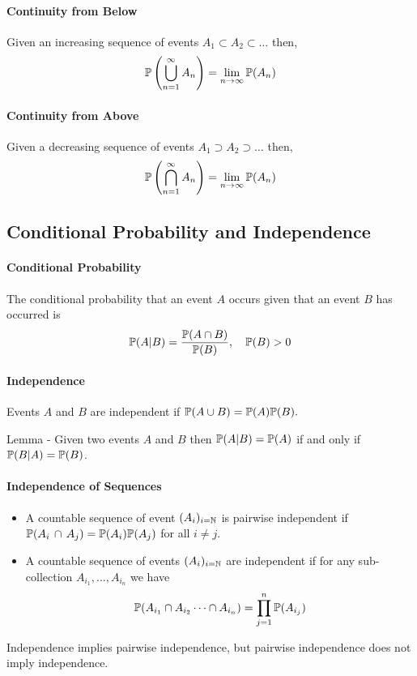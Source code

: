 \paragraph {Continuity from Below}
Given an increasing sequence of events \(A_1 \subset A_2 \subset \dots\) then, 
\[
    \mathbb{P}\left(
        \bigcup_{n=1}^{\infty} A_n
    \right)
    =
    \lim_{n\to\infty} \mathbb{P} (A_n)
\]

\paragraph {Continuity from Above}
Given a decreasing sequence of events \(A_1 \supset A_2 \supset \dots\) then, 
\[
    \mathbb{P}\left(
        \bigcap_{n=1}^{\infty} A_n
    \right)
    =
    \lim_{n\to\infty} \mathbb{P} (A_n)
\]

\subsection{Conditional Probability and Independence}
\paragraph{Conditional Probability}
The conditional probability that an event \(A\) occurs given that an event \(B\) has occurred is 
\[\mathbb{P}(A|B) = \frac{\mathbb{P}(A\cap B)}{\mathbb{P}(B)}, \quad \mathbb{P}(B) > 0\]

\paragraph{Independence}
Events \(A\) and \(B\) are independent if \(\mathbb{P}(A \cup B) = \mathbb{P}(A)\mathbb{P}(B).\)

Lemma - Given two events \(A\) and \(B\) then \(\mathbb{P}(A|B) = \mathbb{P}(A)\) if and only if \(\mathbb{P}(B|A) = \mathbb{P}(B)\).

\paragraph{Independence of Sequences}
\begin{itemize}
    \item A countable sequence of event \((A_i)_{i=\mathbb{N}}\) is pairwise independent if \(\mathbb{P}(A_i \, \cap \, A_j) = \mathbb{P}(A_i)\mathbb{P}(A_j)\) for all \(i \neq j\).
    \item A countable sequence of events \((A_i)_{i=\mathbb{N}}\) are independent if for any sub-collection \(A_{i_1}, \dots, A_{i_n}\) we have 
    \[\mathbb{P}(A_{i_1} \cap A_{i_2} \cdots \cap A_{i_n}) = \prod_{j=1}^n \mathbb{P}(A_{i_j})\]
\end{itemize}
Independence implies pairwise independence, but pairwise independence does not imply independence. 

